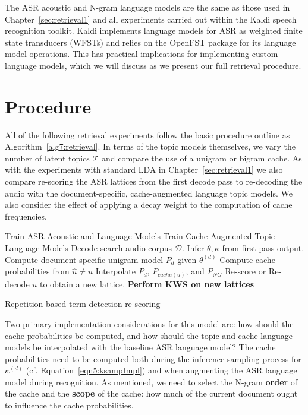 The ASR acoustic and N-gram language models are the same as those used in Chapter~\ref{sec:retrieval1} and all experiments carried out within the Kaldi speech recognition toolkit\cite{kaldi}.  Kaldi implements language models for ASR as weighted finite state transducers (WFSTs) and relies on the OpenFST \cite{openfst} package for its language model operations.   This has practical implications for implementing custom language models, which we will discuss as we present our full retrieval procedure.

\section{Procedure}
All of the following retrieval experiments follow the basic procedure outline as Algorithm~\ref{alg7:retrieval}.  In terms of the topic models themselves, we vary the number of latent topics $\mathcal{T}$ and compare the use of a unigram or bigram cache.  As with the experiments with standard LDA in Chapter~\ref{sec:retrieval1} we also compare re-scoring the ASR lattices from the first decode pass to re-decoding the audio with the document-specific, cache-augmented language topic models.  We also  consider the effect of applying a decay weight to the computation of cache frequencies.

\begin{algorithm}[t]
  \begin{algorithmic}[1]   
  \STATE Train ASR Acoustic and Language Models
  \STATE Train Cache-Augmented Topic Language Models
  \STATE Decode search audio corpus $\mathcal{D}$.
		\STATE Infer $\theta,\kappa$ from first pass output.
		\STATE Compute document-specific unigram model $P_{d}$ given $\theta^{(d)}$
			\STATE Compute cache probabilities from $\hat{u} \ne u$ 
			\STATE Interpolate $P_d$, $P_{cache(u)}$, and $P_{NG}$
			\STATE Re-score or Re-decode $u$ to obtain a new lattice.
		\ENDFOR
  	\ENDFOR
  \STATE \textbf{Perform KWS on new lattices}
  \end{algorithmic}
  \caption{Repetition-based term detection re-scoring}
  \label{alg7:retrieval}
\end{algorithm}

Two primary implementation considerations for this model are:  how should the cache probabilities be computed, and how should the topic and cache language models be interpolated with the baseline ASR language model? The cache probabilities need to be computed both during the inference sampling process for $\kappa^{(d)}$ (cf. Equation~\ref{eqn5:ksampImpl}) and when augmenting the ASR language model during recognition.  As mentioned, we need to select the N-gram \textbf{order} of the cache and the \textbf{scope} of the cache: how much of the current document ought to influence the cache probabilities.

